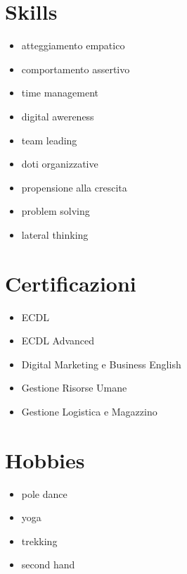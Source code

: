 \documentclass[11pt, a4paper]{article}
\newlength{\headerheight}
\newlength{\leftcolwidth}
\begin{document}
\begin{bgbox}[height=\paperheight-\headerheight,width=\leftcolwidth,colback=cvlightlightgreen]
  \section{Skills}
  \footnotesize
  \begin{itemize}
  \item atteggiamento empatico
  \item comportamento assertivo
  \item time management
  \item digital awereness
  \item team leading
  \item doti organizzative
  \item propensione alla crescita
  \item problem solving
  \item lateral thinking
  \end{itemize}

  \section{Certificazioni}
  \footnotesize
  \begin{itemize}
  \item ECDL
  \item ECDL Advanced
  \item Digital Marketing e Business English
  \item Gestione Risorse Umane
  \item Gestione Logistica e Magazzino
  \end{itemize}

  \section{Hobbies}
  \footnotesize
  \begin{itemize}
  \item pole dance
  \item yoga
  \item trekking
  \item second hand
  \end{itemize}
\end{bgbox}
\end{document}

